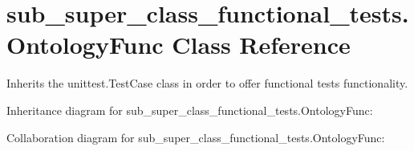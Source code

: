 \hypertarget{classsub__super__class__functional__tests_1_1OntologyFunc}{\section{sub\-\_\-super\-\_\-class\-\_\-functional\-\_\-tests.\-Ontology\-Func Class Reference}
\label{classsub__super__class__functional__tests_1_1OntologyFunc}
}


Inherits the unittest.\-Test\-Case class in order to offer functional tests functionality.  




Inheritance diagram for sub\-\_\-super\-\_\-class\-\_\-functional\-\_\-tests.\-Ontology\-Func\-:


Collaboration diagram for sub\-\_\-super\-\_\-class\-\_\-functional\-\_\-tests.\-Ontology\-Func\-:
